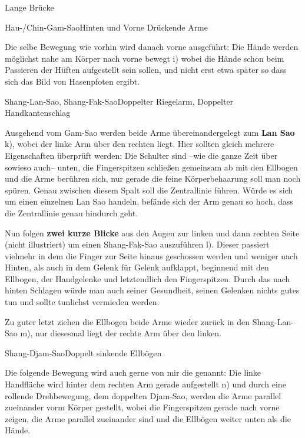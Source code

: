 \begin{WTSatz}{Lange Br\"ucke}
\begin{WTSatzTeil}{Hau-/Chin-Gam-Sao}{Hinten und Vorne Dr\"uckende Arme}
		
		Die selbe Bewegung wie vorhin wird danach vorne ausgef\"uhrt: Die H\"ande werden m\"oglichst nahe am K\"orper nach vorne bewegt i) wobei die H\"ande schon beim Passieren der H\"uften aufgestellt sein sollen, und nicht erst etwa sp\"ater so dass sich das Bild von Hasenpfoten ergibt.
		
	\end{WTSatzTeil}
	\begin{WTSatzTeil}{Shang-Lan-Sao, Shang-Fak-Sao}{Doppelter Riegelarm, Doppelter Handkantenschlag}
		
		Ausgehend vom Gam-Sao werden beide Arme \"ubereinandergelegt zum \textbf{Lan Sao} k), wobei der linke Arm \"uber den rechten liegt. Hier sollten gleich mehrere Eigenschaften \"uberpr\"uft werden: Die Schulter sind --wie die ganze Zeit \"uber sowieso auch-- unten, die Fingerspitzen schlie{\ss}en gemeinsam ab mit den Ellbogen und die Arme ber\"uhren sich, nur gerade die feine K\"orperbehaarung soll man noch sp\"uren. Genau zwischen diesem Spalt soll die Zentrallinie f\"uhren. W\"urde es sich um einen einzelnen Lan Sao handeln, bef\"ande sich der Arm genau so hoch, dass die Zentrallinie genau hindurch geht.
		
		
		Nun folgen \textbf{zwei kurze Blicke} aus den Augen zur linken und dann rechten Seite (nicht illustriert) um einen Shang-Fak-Sao auszuf\"uhren l). Dieser passiert vielmehr in dem die Finger zur Seite hinaus geschossen werden und weniger nach Hinten, als auch in dem Gelenk f\"ur Gelenk aufklappt, beginnend mit den Ellbogen, der Handgelenke und letztendlich den Fingerspitzen. Durch das nach hinten Schlagen w\"urde man auch seiner Gesundheit, seinen Gelenken nichts gutes tun und sollte tunlichst vermieden werden.
		
		Zu guter letzt ziehen die Ellbogen beide Arme wieder zur\"uck in den Shang-Lan-Sao m), nur diesesmal liegt der rechte Arm \"uber den linken.
		
	\end{WTSatzTeil}
	\begin{WTSatzTeil}{Shang-Djam-Sao}{Doppelt sinkende Ellb\"ogen}
		
		Die folgende Bewegung wird auch gerne von mir die  genannt: Die linke Handfl\"ache wird hinter dem rechten Arm gerade aufgestellt n) und durch eine rollende Drehbewegung, dem doppelten Djam-Sao, werden die Arme parallel zueinander vorm K\"orper gestellt, wobei die Fingerspitzen gerade nach vorne zeigen, die Arme parallel zueinander sind und die Ellb\"ogen weiter unten als die H\"ande.
		

\end{WTSatzTeil}
\end{WTSatz}
